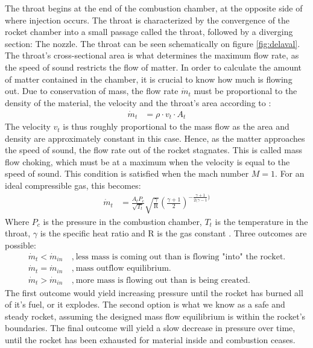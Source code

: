 	The throat begins at the end of the combustion chamber, at the opposite side of where injection occurs. The throat is characterized by the convergence of the rocket chamber into a small passage called the throat, followed by a diverging section: The nozzle. The throat can be seen schematically on figure \ref{fig:delaval}. The throat's cross-sectional area is what determines the maximum flow rate, as the speed of sound restricts the flow of matter. In order to calculate the amount of matter contained in the chamber, it is crucial to know how much is flowing out. Due to conservation of mass, the flow rate $\dot{m}_t$ must be proportional to the density of the material, the velocity and the throat's area according to \cite{nasacompflow}:
		\begin{align}
			\dot{m}_t &= \rho \cdot v_t \cdot A_t
		\end{align}
		The velocity $v_t$ is thus roughly proportional to the mass flow as the area and density are approximately constant in this case. Hence, as the matter approaches the speed of sound, the flow rate out of the rocket stagnates. This is called mass flow choking, which must be at a maximum when the velocity is equal to the speed of sound. This condition is satisfied when the mach number $M=1$. For an ideal compressible gas, this becomes:
		\begin{align}
			\dot{m}_t &= \frac{A_t P_c}{\sqrt{T_t}} \sqrt{\frac{\gamma}{\text{R}}} \left(\frac{\gamma+1}{2}\right)^{-\frac{\gamma+1}{2(\gamma-1})}
		\end{align}
	Where $P_c$ is the pressure in the combustion chamber, $T_t$ is the temperature in the throat, $\gamma$ is the specific heat ratio and R is the gas constant \cite{nasacompflow}. Three outcomes are possible:
	\begin{align*}
		\dot{m}_t < \dot{m}_{in} & ~,~ \text{less mass is coming out than is flowing "into" the rocket.} \\
		\dot{m}_t = \dot{m}_{in} & ~,~ \text{mass outflow equilibrium.} \\
		\dot{m}_t > \dot{m}_{in} & ~,~ \text{more mass is flowing out than is being created.}
	\end{align*}
	The first outcome would yield increasing pressure until the rocket has burned all of it's fuel, or it explodes. The second option is what we know as a safe and steady rocket, assuming the designed mass flow equilibrium is within the rocket's boundaries. The final outcome will yield a slow decrease in pressure over time, until the rocket has been exhausted for material inside and combustion ceases. 

